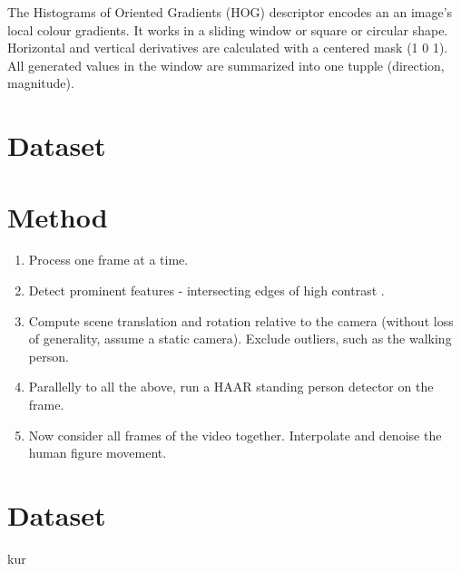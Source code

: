 \documentclass{article}
\begin{document}
The Histograms of Oriented Gradients (HOG)\cite{hog} descriptor encodes an an image's local colour gradients.
It works in a sliding window or square or circular shape.
Horizontal and vertical derivatives are calculated with a centered mask (1 0 1).
All generated values in the window are summarized into one tupple (direction, magnitude).


\section{Dataset}



\section{Method}
\begin{enumerate}
\item{Process one frame at a time.}
\item{Detect prominent features - intersecting edges of high contrast .}
\item{Compute scene translation and rotation relative to the camera (without loss of generality, assume a static camera). Exclude outliers, such as the walking person.}
\item{Parallelly to all the above, run a HAAR standing person detector on the frame.}
\item{Now consider all frames of the video together. Interpolate and denoise the human figure movement.}
\end{enumerate}


\section{Dataset}
kur\cite{largest}


\printbibliography
\end{document}
